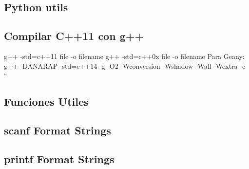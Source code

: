 \subsection{Python utils}

\subsection{Compilar C++11 con g++}
\begin{code}
g++ -std=c++11 {file} -o {filename}
g++ -std=c++0x {file} -o {filename}
Para Geany: g++ -DANARAP -std=c++14 -g -O2 -Wconversion -Wshadow -Wall -Wextra -c “%
\end{code}
%
\subsection{Funciones Utiles}

\subsection{scanf Format Strings}

\subsection{printf Format Strings}

